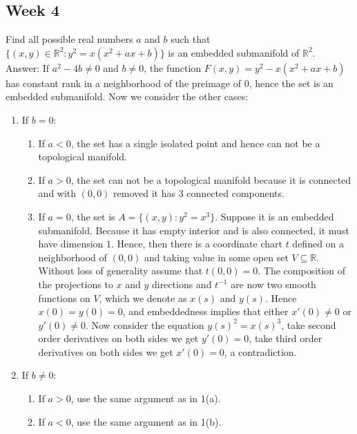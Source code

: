 \documentclass{article}
\theoremstyle{definition}
\begin{document}
\subsection{Week 4}

Find all possible real numbers $a$ and $b$ such that $\{(x,y)\in\mathbb{R}^2:y^2=x(x^2+ax+b)\}$ is an embedded submanifold of $\mathbb{R}^2$.\\

Answer: If $a^2-4b\not=0$ and $b\not=0$, the function $F(x, y)=y^2-x(x^2+ax+b)$ has constant rank in a neighborhood of the preimage of $0$, hence the set is an embedded submanifold. Now we consider the other cases:

\begin{enumerate}
    \item If $b=0$:
       \begin{enumerate}
           \item If $a<0$, the set has a single isolated point and hence can not be a topological manifold.
           \item If $a>0$, the set can not be a topological manifold because it is connected and with $(0, 0)$ removed it has $3$ connected components.
           \item If $a=0$, the set is $A=\{(x, y): y^2=x^3\}$. Suppose it is an embedded submanifold. Because it has empty interior and is also connected, it must have dimension $1$. Hence, then there is a coordinate chart $t$ defined on a neighborhood of $(0, 0)$ and taking value in some open set $V\subseteq\mathbb{R}$. Without loss of generality assume that $t(0, 0)=0$. The composition of the projections to $x$ and $y$ directions and $t^{-1}$ are now two smooth functions on $V$, which we denote as $x(s)$ and $y(s)$. Hence $x(0)=y(0)=0$, and embeddedness implies that either $x'(0)\not=0$ or $y'(0)\not=0$. Now consider the equation $y(s)^2=x(s)^3$, take second order derivatives on both sides we get $y'(0)=0$, take third order derivatives on both sides we get $x'(0)=0$, a contradiction.
       \end{enumerate}
    \item If $b\not=0$:
       \begin{enumerate}
           \item If $a>0$, use the same argument as in 1(a).
           \item If $a<0$, use the same argument as in 1(b).
       \end{enumerate}
       
\end{enumerate}
\end{document}
